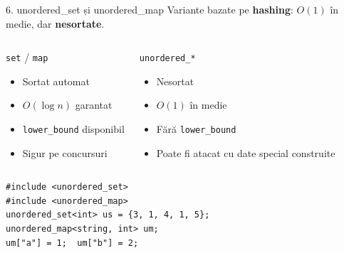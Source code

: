 ﻿\documentclass{beamer}
\begin{document}
\begin{frame}[fragile]{6. unordered\_set și unordered\_map}
  Variante bazate pe \textbf{hashing}: $O(1)$ în medie, dar \textbf{nesortate}.

  \begin{columns}[T]
    \begin{block}{\texttt{set} / \texttt{map}}
      \begin{itemize}\footnotesize\itemsep1pt
        \item Sortat automat
        \item $O(\log n)$ garantat
        \item \texttt{lower\_bound} disponibil
        \item Sigur pe concursuri
      \end{itemize}
    \end{block}

    \begin{block}{\texttt{unordered\_*}}
      \begin{itemize}\footnotesize\itemsep1pt
        \item Nesortat
        \item $O(1)$ în medie
        \item Fără \texttt{lower\_bound}
        \item Poate fi atacat cu date special construite
      \end{itemize}
    \end{block}
  \end{columns}

  \smallskip
  \begin{lstlisting}
#include <unordered_set>
#include <unordered_map>
unordered_set<int> us = {3, 1, 4, 1, 5};
unordered_map<string, int> um;
um["a"] = 1;  um["b"] = 2;
  \end{lstlisting}
\end{frame}
\end{document}

